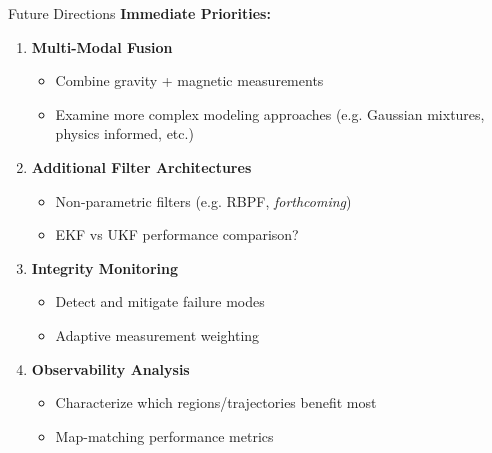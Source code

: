 \documentclass[aspectratio=169]{beamer}
\begin{document}
\begin{frame}{Future Directions}
\textbf{Immediate Priorities:}
\begin{enumerate}
    \item \textbf{Multi-Modal Fusion}
    \begin{itemize}
        \item Combine gravity + magnetic measurements
        \item Examine more complex modeling approaches (e.g. Gaussian mixtures, physics informed, etc.)
    \end{itemize}
    \pause
    \item \textbf{Additional Filter Architectures}
    \begin{itemize}
        \item Non-parametric filters (e.g. RBPF, \textit{forthcoming})
        \item EKF vs UKF performance comparison?
    \end{itemize}
    \pause
    \item \textbf{Integrity Monitoring}
    \begin{itemize}
        \item Detect and mitigate failure modes
        \item Adaptive measurement weighting
    \end{itemize}
    \pause
    \item \textbf{Observability Analysis}
    \begin{itemize}
        \item Characterize which regions/trajectories benefit most
        \item Map-matching performance metrics
    \end{itemize}
\end{enumerate}
\end{frame}
\end{document}
